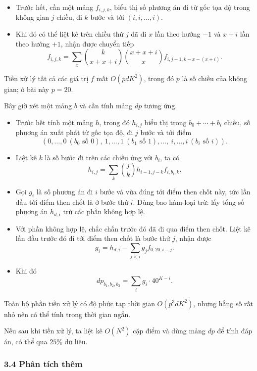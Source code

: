 \documentclass[11pt]{article}
\begin{document}
\begin{itemize}
  \item Trước hết, cần một mảng \(f_{i,j,k}\), biểu thị số phương án đi từ gốc
  tọa độ trong không gian \(j\) chiều, đi \(k\) bước và tới
  \((i,i,\ldots,i)\).
  \item Khi đó có thể liệt kê trên chiều thứ \(j\) đã đi \(x\) lần theo hướng
  \(-1\) và \(x+i\) lần theo hướng \(+1\), nhận được chuyển tiếp
  \[
    f_{i,j,k}
    =
    \sum_x
    \binom{k}{x+x+i}
    \binom{x+x+i}{x}
    f_{i,j-1,k-x-(x+i)} .
  \]
\end{itemize}

Tiền xử lý tất cả các giá trị \(f\) mất \(O(pdK^2)\), trong đó \(p\) là số
chiều của không gian; ở bài này \(p=20\).

Bây giờ xét một mảng \(b\) và cần tính mảng \(dp\) tương ứng.

\begin{itemize}
  \item Trước hết tính một mảng \(h\), trong đó \(h_{i,j}\) biểu thị trong
  \(b_0+\cdots+b_i\) chiều, số phương án xuất phát từ gốc tọa độ, đi \(j\) bước
  và tới điểm
  \[
    (0,\ldots,0\ (b_0\text{ số }0),\ 1,\ldots,1\ (b_1\text{ số }1),
    \ldots,\ i,\ldots,i\ (b_i\text{ số }i)).
  \]
  \item Liệt kê \(k\) là số bước đi trên các chiều ứng với \(b_i\), ta có
  \[
    h_{i,j}=\sum_k \binom{j}{k}h_{i-1,j-k}f_{i,b_i,k}.
  \]
  \item Gọi \(g_i\) là số phương án đi \(i\) bước và vừa đúng tới điểm then
  chốt này, tức lần đầu tới điểm then chốt là ở bước thứ \(i\). Dùng bao
  hàm-loại trừ: lấy tổng số phương án \(h_{d,i}\) trừ các phần không hợp lệ.
  \item Với phần không hợp lệ, chắc chắn trước đó đã đi qua điểm then chốt.
  Liệt kê lần đầu trước đó đi tới điểm then chốt là bước thứ \(j\), nhận được
  \[
    g_i=h_{d,i}-\sum_{j<i}g_j f_{0,20,i-j}.
  \]
  \item Khi đó
  \[
    dp_{b_1,b_2,b_3}=\sum_i g_i\cdot 40^{K-i}.
  \]
\end{itemize}

Toàn bộ phần tiền xử lý có độ phức tạp thời gian \(O(p^3dK^2)\), nhưng hằng số
rất nhỏ nên có thể tính trong thời gian ngắn.

Nếu sau khi tiền xử lý, ta liệt kê \(O(N^2)\) cặp điểm và dùng mảng \(dp\) để
tính đáp án, có thể qua \(25\%\) dữ liệu.

\subsubsection*{3.4 Phân tích thêm}
\end{document}
